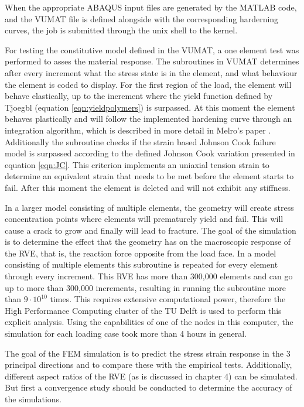 When the appropriate ABAQUS input files are generated by the MATLAB code, and the VUMAT file is defined alongside with the corresponding harderning curves, the job is submitted through the unix shell to the kernel.

For testing the constitutive model defined in the VUMAT, a one element test was performed to asses the material response. The subroutines in VUMAT determines after every increment what the stress state is in the element, and what behaviour the element is coded to display. For the first region of the load, the element will behave elastically, up to the increment where the yield function defined by Tjoegbl  (equation \ref{eqn:yieldpolymers}) is surpassed. At this moment the element behaves plastically and will follow the implemented hardening curve through an integration algorithm, which is described in more detail in Melro's paper \cite{Melro2013MicromechanicalModelling}.  Additionally the subroutine checks if the strain based Johnson Cook failure model is surpassed according to the defined Johnson Cook variation presented in equation \ref{eqn:JC}. This criterion implements an uniaxial tension strain to determine an equivalent strain that needs to be met before the element starts to fail. After this moment the element is deleted and will not exhibit any stiffness. 

In a larger model consisting of multiple elements, the geometry will create stress concentration points where elements will prematurely yield and fail. This will cause a crack to grow and finally will lead to fracture. The goal of the simulation is to determine the effect that the geometry has on the macroscopic response of the RVE, that is, the reaction force opposite from the load face.
In a model consisting of multiple elements this subroutine is repeated for every element through every increment. This RVE has more than 300,000 elements and can go up to more than 300,000 increments, resulting in running the subroutine more than $9\cdot 10^{10}$ times. This requires extensive computational power, therefore the High Performance Computing cluster of the TU Delft is used to perform this explicit analysis. Using the capabilities of one of the nodes in this computer, the simulation for each loading case took more than 4 hours in general.

The goal of the FEM simulation is to predict the stress strain response in the 3 principal directions and to compare these with the empirical tests. Additionally, different aspect ratios of the RVE (as is discussed in chapter 4) can be simulated. But first a convergence study should be conducted to determine the accuracy of the simulations.

